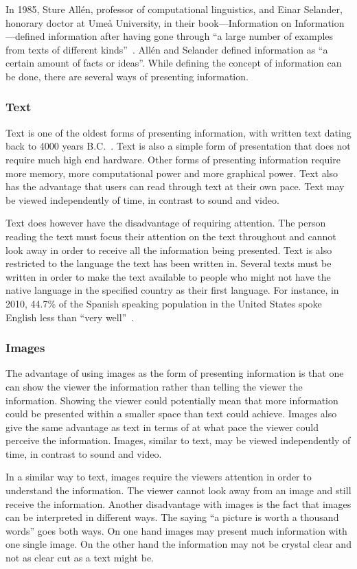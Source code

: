 In 1985, Sture All{\'e}n, professor of computational linguistics, and Einar Selander, honorary doctor at Ume{\aa} University, in their book---Information on Information---defined information after having gone through ``a large number of examples from texts of different kinds''~\cite{informationDef1}. All{\'e}n and Selander defined information as ``a certain amount of facts or ideas''. While defining the concept of information can be done, there are several ways of presenting information.

\subsubsection{Text}
Text is one of the oldest forms of presenting information, with written text dating back to 4000 years B.C.~\cite{cuneiform}. Text is also a simple form of presentation that does not require much high end hardware. Other forms of presenting information require more memory, more computational power and more graphical power. Text also has the advantage that users can read through text at their own pace. Text may be viewed independently of time, in contrast to sound and video.

Text does however have the disadvantage of requiring attention. The person reading the text must focus their attention on the text throughout and cannot look away in order to receive all the information being presented. Text is also restricted to the language the text has been written in. Several texts must be written in order to make the text available to people who might not have the native language in the specified country as their first language. For instance, in 2010, 44.7\% of the Spanish speaking population in the United States spoke English less than ``very well''~\cite{spanishUS}.

\subsubsection{Images}
The advantage of using images as the form of presenting information is that one can show the viewer the information rather than telling the viewer the information. Showing the viewer could potentially mean that more information could be presented within a smaller space than text could achieve. Images also give the same advantage as text in terms of at what pace the viewer could perceive the information. Images, similar to text, may be viewed independently of time, in contrast to sound and video.

In a similar way to text, images require the viewers attention in order to understand the information. The viewer cannot look away from an image and still receive the information. Another disadvantage with images is the fact that images can be interpreted in different ways. The saying ``a picture is worth a thousand words'' goes both ways. On one hand images may present much information with one single image. On the other hand the information may not be crystal clear and not as clear cut as a text might be.

